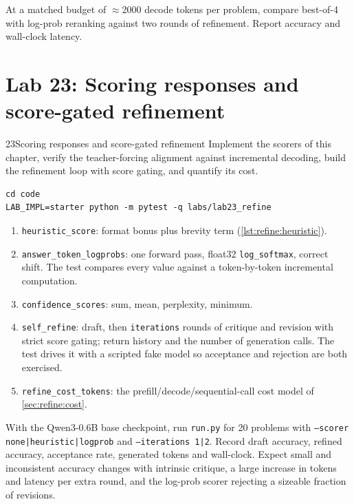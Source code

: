\begin{exercise}
At a matched budget of $\approx$2000 decode tokens per problem, compare best-of-4 with log-prob
reranking against two rounds of refinement. Report accuracy and wall-clock latency.
\end{exercise}

\section{Lab 23: Scoring responses and score-gated refinement}\label{sec:refine:lab}

\begin{labbox}{23}{Scoring responses and score-gated refinement}
Implement the scorers of this chapter, verify the teacher-forcing alignment against incremental
decoding, build the refinement loop with score gating, and quantify its cost.

\begin{lstlisting}[style=shell]
cd code
LAB_IMPL=starter python -m pytest -q labs/lab23_refine
\end{lstlisting}

\begin{enumerate}
  \item \texttt{heuristic\_score}: format bonus plus brevity term (\cref{lst:refine:heuristic}).
  \item \texttt{answer\_token\_logprobs}: one forward pass, float32 \texttt{log\_softmax}, correct
  shift. The test compares every value against a token-by-token incremental computation.
  \item \texttt{confidence\_scores}: sum, mean, perplexity, minimum.
  \item \texttt{self\_refine}: draft, then \texttt{iterations} rounds of critique and revision with
  strict score gating; return history and the number of generation calls. The test drives it with a
  scripted fake model so acceptance and rejection are both exercised.
  \item \texttt{refine\_cost\_tokens}: the prefill/decode/sequential-call cost model of
  \cref{sec:refine:cost}.
\end{enumerate}

With the Qwen3-0.6B base checkpoint, run \texttt{run.py} for 20 problems with
\texttt{--scorer none|heuristic|logprob} and \texttt{--iterations 1|2}. Record draft accuracy,
refined accuracy, acceptance rate, generated tokens and wall-clock. Expect small and inconsistent
accuracy changes with intrinsic critique, a large increase in tokens and latency per extra round, and
the log-prob scorer rejecting a sizeable fraction of revisions.


\end{labbox}
